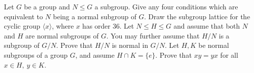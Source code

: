 \documentclass{exam}
\begin{document}
\centering
{}
\vspace{1em}

\begin{questions}
    \question[20]
        Let $G$ be a group and $N\leq G$ a subgroup. Give any four conditions which are equivalent to $N$ being a normal subgroup of $G$.
    \question[30]
        Draw the subgroup lattice for the cyclic group $\langle x\rangle$, where $x$ has order $36$.
    \question[30]
        Let $N\leq H\leq G$ and assume that both $N$ and $H$ are normal subgroups of $G$. You may further assume that $H/N$ is a subgroup of $G/N$. Prove that $H/N$ is normal in $G/N$.
    \question[30]
        Let $H, K$ be normal subgroups of a group $G$, and assume $H\cap K = \{e\}$. Prove that $xy=yx$ for all $x\in H, \ y\in K$.
\end{questions}
\end{document}
